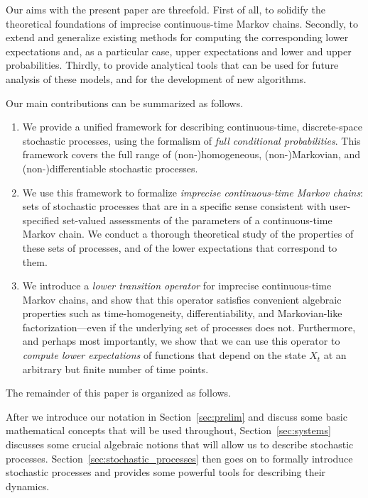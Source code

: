 \documentclass[10pt,a4paper]{paper}
\theoremstyle{definition}
\begin{document}
Our aims with the present paper are threefold. First of all, to solidify the theoretical foundations of imprecise continuous-time Markov chains. Secondly, to extend and generalize existing methods for computing the corresponding lower expectations and, as a particular case, upper expectations and lower and upper probabilities. Thirdly, to provide analytical tools that can be used for future analysis of these models, and for the development of new algorithms.

Our main contributions can be summarized as follows.
\begin{enumerate}
\item We provide a unified framework for describing continuous-time, discrete-space stochastic processes, using the formalism of \emph{full conditional probabilities}. This framework covers the full range of (non-)homogeneous, (non-)Markovian, and (non-)differentiable stochastic processes.
\item We use this framework to formalize \emph{imprecise continuous-time Markov chains}: sets of stochastic processes that are in a specific sense consistent with user-specified set-valued assessments of the parameters of a continuous-time Markov chain. We conduct a thorough theoretical study of the properties of these sets of processes, and of the lower expectations that correspond to them. 
\item We introduce a \emph{lower transition operator} for imprecise continuous-time Markov chains, and show that this operator satisfies convenient algebraic properties such as time-homogeneity, differentiability, and Markovian-like factorization---even if the underlying set of processes does not. Furthermore, and perhaps most importantly, we show that we can use this operator to \emph{compute lower expectations} of functions that depend on the state $X_t$ at an arbitrary but finite number of time points.%
\end{enumerate}

The remainder of this paper is organized as follows. 

After we  introduce our notation in Section~\ref{sec:prelim} and discuss some basic mathematical concepts that will be used throughout, Section~\ref{sec:systems} discusses some crucial algebraic notions that will allow us to describe stochastic processes. Section~\ref{sec:stochastic_processes} then goes on to formally introduce stochastic processes and provides some powerful tools for describing their dynamics.
\end{document}
